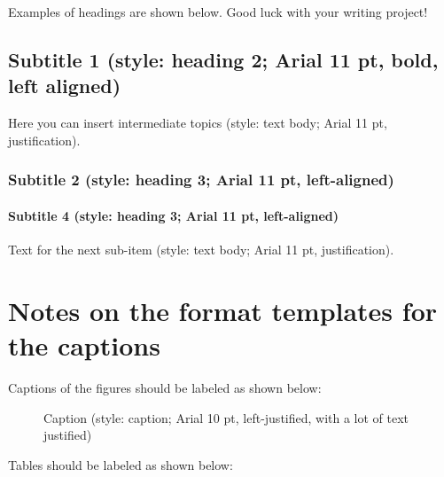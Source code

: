 Examples of headings are shown below. Good luck with your writing project!

\subsection{Subtitle 1 (style: heading 2; Arial 11 pt, bold, left aligned)}

Here you can insert intermediate topics (style: text body; Arial 11 pt, justification).


\subsubsection{Subtitle 2 (style: heading 3; Arial 11 pt, left-aligned)}


\paragraph{Subtitle 4 (style: heading 3; Arial 11 pt, left-aligned)}

Text for the next sub-item (style: text body; Arial 11 pt, justification).

\section{Notes on the format templates for the captions}

Captions of the figures should be labeled as shown below:

\begin{figure}
	\caption{Caption (style: caption; Arial 10 pt, left-justified, with a lot of text justified)}
\end{figure}

Tables should be labeled as shown below:

\begin{table}
	\caption{Table caption (style: caption; Arial 10 pt, left-justified, with a lot of text justified)}
\end{table}

%
\printbibliography


